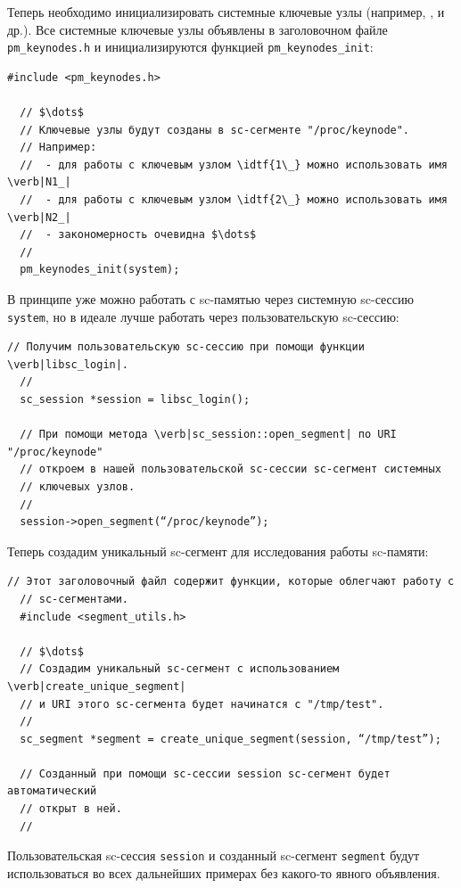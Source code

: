 Теперь необходимо инициализировать системные ключевые узлы (например,
,  и др.). Все системные ключевые узлы объявлены в
заголовочном файле \verb|pm_keynodes.h| и инициализируются функцией
\lstinline{pm_keynodes_init}:

\begin{lstlisting}[texcl]
  #include <pm_keynodes.h>

  // $\dots$
  // Ключевые узлы будут созданы в sc-сегменте "/proc/keynode".
  // Например:
  //  - для работы с ключевым узлом \idtf{1\_} можно использовать имя \verb|N1_|
  //  - для работы с ключевым узлом \idtf{2\_} можно использовать имя \verb|N2_|
  //  - закономерность очевидна $\dots$
  //
  pm_keynodes_init(system);
\end{lstlisting}

В принципе уже можно работать с sc-памятью через системную sc-сессию
\lstinline{system}, но в идеале лучше работать через пользовательскую
sc-сессию:

\begin{lstlisting}[texcl]
  // Получим пользовательскую sc-сессию при помощи функции \verb|libsc_login|.
  //
  sc_session *session = libsc_login();

  // При помощи метода \verb|sc_session::open_segment| по URI "/proc/keynode"
  // откроем в нашей пользовательской sc-сессии sc-сегмент системных 
  // ключевых узлов.
  //
  session->open_segment(“/proc/keynode”);
\end{lstlisting}

Теперь создадим уникальный sc-сегмент для исследования работы
sc-памяти:

\begin{lstlisting}[texcl]
  // Этот заголовочный файл содержит функции, которые облегчают работу с 
  // sc-сегментами.
  #include <segment_utils.h>
  
  // $\dots$
  // Создадим уникальный sc-сегмент с использованием \verb|create_unique_segment|
  // и URI этого sc-сегмента будет начинатся с "/tmp/test".
  // 
  sc_segment *segment = create_unique_segment(session, “/tmp/test”);

  // Созданный при помощи sc-сессии session sc-сегмент будет автоматический
  // открыт в ней.
  //
\end{lstlisting}

Пользовательская sc-сессия \lstinline{session} и созданный sc-сегмент
\lstinline{segment} будут использоваться во всех дальнейших примерах
без какого-то явного объявления.

